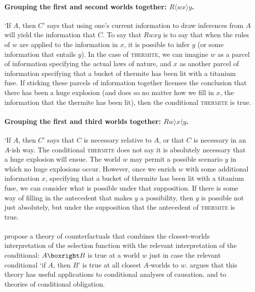 \paragraph{Grouping the first and second worlds together: $R\langle wx \rangle y$.} `If $A$, then $C$' says that using one's current information to draw inferences from $A$ will yield the information that $C$.  To say that $Rwxy$ is to say that when the rules of $w$ are applied to the information in $x$, it is possible to infer $y$ (or some information that entails $y$). In the case of \textsc{thermite}, we can imagine $w$ as a parcel of information specifying the actual laws of nature, and $x$ as another parcel of information specifying that a bucket of thermite has been lit with a titanium fuse.  If sticking these parcels of information together licenses the conclusion that there has been a huge explosion (and does so no matter how we fill in $x$, the information that the thermite has been lit), then the conditional \textsc{thermite} is true.

\paragraph{Grouping the first and third worlds together: $R w\rangle x \langle y$.} `If $A$, then $C$' says that $C$ is necessary relative to $A$, or that $C$ is necessary in an $A$-ish way.  The conditional \textsc{thermite} does not say it is absolutely necessary that a huge explosion will ensue. The world $w$ may permit a possible scenario $y$ in which no huge explosions occur.  However, once we enrich $w$ with some additional information $x$, specifying that a bucket of thermite has been lit with a titanium fuse, we can consider what is possible under that supposition.  If there is some way of filling in the antecedent that makes $y$ a possibility, then $y$ is possible not just absolutely, but under the supposition that the antecedent of \textsc{thermite} is true.

\paragraph{}
\citet{Mares1995-MARART-2} propose a theory of counterfactuals that combines the closest-worlds interpretation of the selection function with the relevant interpretation of the conditional: $A \boxright B$ is true at a world $w$ just in case the relevant conditional `if $A$, then $B$' is true at all closest $A$-worlds to $w$.  \citet{Mares1994-MARWWN} argues that this theory has useful applications to conditional analyses of causation, and to theories of conditional obligation.

